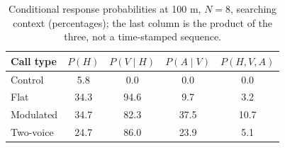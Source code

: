 \begin{table}[!ht]
\centering
\caption{Conditional response probabilities at 100 m, $N=8$, searching context (percentages); the last column is the product of the three, not a time-stamped sequence.}
\label{tab:p6casc}
\small
\begin{tabular}{lcccc}
\toprule
Call type & $P(H)$ & $P(V\mid H)$ & $P(A\mid V)$ & $P(H,V,A)$ \\
\midrule
Control & 5.8 & 0.0 & 0.0 & 0.0 \\
Flat & 34.3 & 94.6 & 9.7 & 3.2 \\
Modulated & 34.7 & 82.3 & 37.5 & 10.7 \\
Two-voice & 24.7 & 86.0 & 23.9 & 5.1 \\
\bottomrule
\end{tabular}
\end{table}